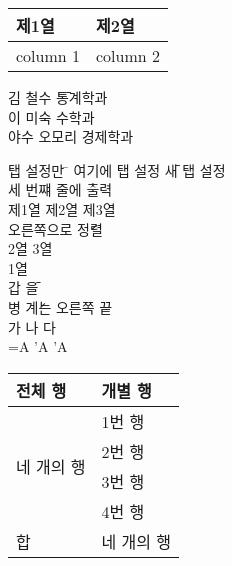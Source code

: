 \documentclass[11pt]{article}
\begin{document}
{\tabcolsep=0in
\begin{tabular}{l|l}
제1열 & 제2열 \\ \hline column 1 & column 2
\end{tabular}}

\begin{tabbing}
김 철수 \= 통계학과 \\
이 미숙 \> 수학과 \\
야수 오모리 \> 경제학과
\end{tabbing}

\begin{tabbing}
탭 설정만 \= \kill
여기에 \> 탭 설정 \= 새 탭 설정 \+\+ \\
세 번쨰 줄에 출력 \\
\< \< 제1열 \> 제2열 \> 제3열 \\
오른쪽으로 \' 정렬 \- \\
2열 \> 3열 \- \\
1열 \\
\pushtabs
갑 \= 을 \\
 \> 병 \' 계는 오른쪽 끝 \\
\poptabs
가 \> 나 \> 다 \\
\a ={A} \> \a'{A} \> \a'{A}
\end{tabbing}

\begin{tabular}{|l|l|} \hline
전체 행	& 개별 행 \\ \hline
\multirow{4}{*}{네 개의 행} & 1번 행 \\
& 2번 행 \\
& 3번 행 \\
& 4번 행 \\ \hline
합 & 네 개의 행 \\ \hline
\end{tabular}
\end{document}
